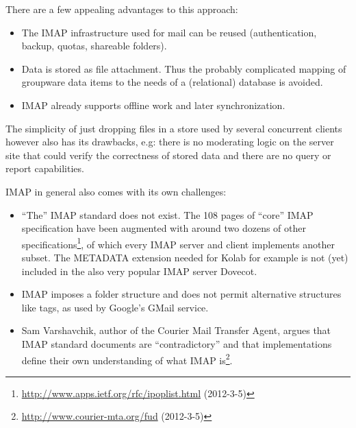 \documentclass[11pt,a4paper,headsepline,twoside]{scrartcl}		%
\newcommand{\citeurl}[2]{\url{#1} (#2)}
\begin{document}
There are a few appealing advantages to this approach:

\begin{itemize}
\item The IMAP infrastructure used for mail can be reused (authentication,
  backup, quotas, shareable folders).
\item Data is stored as file attachment. Thus the probably complicated mapping
  of groupware data items to the needs of a (relational) database is avoided.
  \item IMAP already supports offline work and later synchronization.
\end{itemize}

The simplicity of just dropping files in a store used by several concurrent
clients however also has its drawbacks, e.g: there is no moderating logic on the
server site that could verify the correctness of stored data and there are no
query or report capabilities.

IMAP in general also comes with its own challenges:

\begin{itemize}
\item ``The'' IMAP standard does not exist. The 108 pages of ``core'' IMAP
  specification \cite{RFC3501} have been augmented with around two
  dozens of other
  specifications\footnote{\citeurl{http://www.apps.ietf.org/rfc/ipoplist.html}{2012-3-5}},
  of which every IMAP server and client implements another subset. The METADATA
  extension needed for Kolab for example is not (yet) included in the also very
  popular IMAP server Dovecot.
\item IMAP imposes a folder structure and does not permit alternative structures
  like tags, as used by Google's GMail service.
\item Sam Varshavchik, author of the Courier Mail Transfer Agent, argues that
  IMAP standard documents are ``contradictory'' and that implementations define
  their own understanding of what IMAP
  is\footnote{\citeurl{http://www.courier-mta.org/fud}{2012-3-5}}.
\end{itemize}
\end{document}
